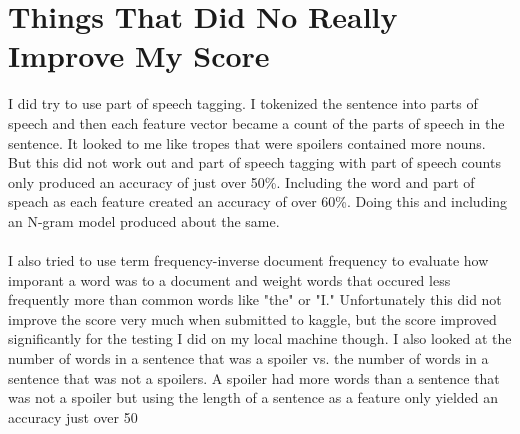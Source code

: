 \documentclass[11pt]{article}
\begin{document}
\section*{Things That Did No Really Improve My Score}
I did try to use part of speech tagging.  I tokenized the sentence into parts of speech and then each feature vector became a count of the parts of speech in the sentence.  It looked to me like tropes that were spoilers contained more nouns.  But this did not work out and part of speech tagging with part of speech counts only produced an accuracy of just over 50\%.  Including the word and part of speach as each feature created an accuracy of over 60\%.  Doing this and including an N-gram model produced about the same.
\\ \\
I also tried to use term frequency-inverse document frequency to evaluate how imporant a word was to a document and weight words that occured less frequently more than common words like "the" or "I."  Unfortunately this did not improve the score very much when submitted to kaggle, but the score improved significantly for the testing I did on my local machine though.  I also looked at the number of words in a sentence that was a spoiler vs. the number of words in a sentence that was not a spoilers.  A spoiler had more words than a sentence that was not a spoiler but using the length of a sentence as a feature only yielded an accuracy just over 50%
\end{document}
